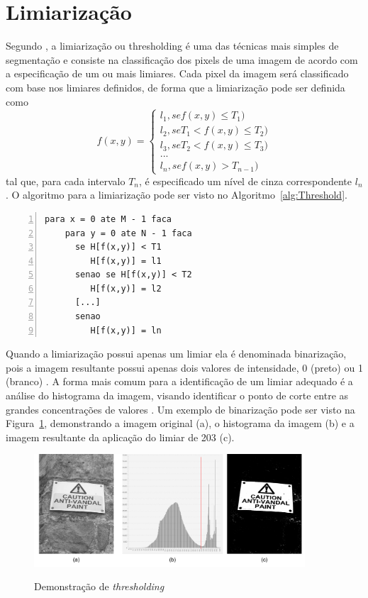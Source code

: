 \documentclass[12pt,oneside,a4paper,english,french,spanish,brazil,]{abntex2}
\begin{document}
\section{Limiarização}

Segundo \citet{pedrini:2008}, a limiarização ou thresholding é uma das técnicas mais simples de segmentação e consiste na classificação dos pixels de uma imagem de acordo com a especificação de um ou mais limiares. Cada pixel da imagem será classificado com base nos limiares definidos, de forma que a limiarização pode ser definida como \[f(x,y)=\left\{\begin{matrix} l_1, se f(x,y) \leq T_1) \\ l_2, se T_1 < f(x,y) \leq T_2)\\ l_3, se T_2 < f(x,y) \leq T_3)\\ ...\\ l_n, se f(x,y) > T_{n-1}) \end{matrix}\right.\] tal que, para cada intervalo \(T_n\), é especificado um nível de cinza correspondente \(l_n\). O algoritmo para a limiarização pode ser visto no Algoritmo~\ref{alg:Threshold}.

\begin{lstlisting}[caption={Algoritmo para limiatrização}, label=alg:Threshold, numbers=left]
para x = 0 ate M - 1 faca
    para y = 0 ate N - 1 faca
      se H[f(x,y)] < T1
         H[f(x,y)] = l1
      senao se H[f(x,y)] < T2
         H[f(x,y)] = l2
      [...]
      senao 
         H[f(x,y)] = ln
\end{lstlisting}

Quando a limiarização possui apenas um limiar ela é denominada binarização, pois a imagem resultante possui apenas dois valores de intensidade, 0 (preto) ou 1 (branco) \cite{pedrini:2008}. A forma mais comum para a identificação de um limiar adequado é a análise do histograma da imagem, visando identificar o ponto de corte entre as grandes concentrações de valores \cite{gonzalez:2012}. Um exemplo de binarização pode ser visto na Figura~\ref{fig:PDI_Limiarizacao}, demonstrando a imagem original (a), o histograma da imagem (b) e a imagem resultante da aplicação do limiar de  203 (c).

\begin{figure}[ht]
\centering
\caption{ Demonstração de \textit{thresholding}}
\includegraphics[width=0.9\textwidth]{imagens/PDI_Limiarizacao.pdf}
\sourceAuthor
\label{fig:PDI_Limiarizacao}
\end{figure}
\end{document}
